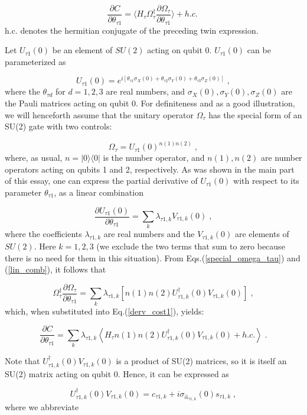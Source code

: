 \documentclass[12pt]{article}
\newcommand{\bra}[1]{\langle#1|}
\newcommand{\ket}[1]{|#1\rangle}
\newcommand{\beq}{\begin{equation}}
\newcommand{\eeq}{\end{equation}}
\begin{document}
{\beq
\frac{\partial C}{\partial\theta_{\tau 1}}
=
\langle H_\tau
\Omega_\tau^\dagger
\frac{\partial \Omega_\tau}{\partial\theta_{\tau 1}}
\rangle
+ h.c.
\;
\label{derv_cost1}
\eeq
h.c. denotes the hermitian conjugate
of the preceding twin expression.

Let $U_{\tau 1}(0)$
be an element of $SU(2)$ acting on qubit 0.
$U_{\tau 1}(0)$ can be parameterized as


\beq
U_{\tau 1}(0)=
e^{i[\theta_{\tau 1}\sigma_X(0)
+
\theta_{\tau 2}\sigma_Y(0)
+
\theta_{\tau 3}\sigma_Z(0)]}
\;,
\eeq
where the $\theta_{\tau d}$ for $d=1,2,3$
are real numbers,
and $\sigma_X(0), \sigma_Y(0), \sigma_Z(0)$
are
the Pauli matrices acting on qubit 0.
For definiteness and as a good illustration,
we will henceforth assume that the
unitary operator $\Omega_\tau$
has the special form
of an SU(2) gate with two controls:

\beq
\Omega_{\tau}=
U_{\tau 1}(0)^{n(1)n(2)}
\;,
\label{special_omega_tau}
\eeq
where, as usual, $n=\ket{0}\bra{0}$
is the number operator, and $n(1), n(2)$
are number operators acting on qubits 1 and 2,
respectively.
As was shown in the main part of this essay,
one can express the partial derivative of
$U_{\tau 1}(0)$ with respect
 to its parameter $\theta_{\tau 1}$,
as a linear combination


\beq
\frac{\partial U_{\tau 1}(0)}{\partial\theta_{\tau 1}}
=
\sum_k \lambda_{\tau 1,k} V_{\tau 1,k}(0)
\;,
\label{lin_comb}
\eeq
where the
coefficients $\lambda_{\tau 1,k}$
are real numbers and the
$V_{\tau 1,k}(0)$ are elements of $SU(2)$.
Here
$k=1,2,3$ (we exclude the two terms that sum to zero
because there is no need for them in this situation).
From Eqs.(\ref{special_omega_tau})
and (\ref{lin_comb}), it follows that

\beq
\Omega^\dagger_\tau
\frac{\partial \Omega_\tau}{\partial\theta_{\tau 1}}
=
\sum_k \lambda_{\tau 1,k}\left[
n(1)n(2)U^\dagger_{\tau 1,k}(0)V_{\tau 1,k}(0)
\right]
\;,
\eeq
which, when substituted into Eq.(\ref{derv_cost1}),
yields:

\beq
\frac{\partial C}{\partial\theta_{\tau 1}}
=
\sum_k \lambda_{\tau 1,k}
\left\langle
H_\tau n(1)n(2)U^\dagger_{\tau 1,k}(0)V_{\tau 1,k}(0)
+h.c.\right\rangle
\;.
\eeq

Note that
$U^\dagger_{\tau 1,k}(0)V_{\tau 1,k}(0)$ is
a product of SU(2) matrices, so
it is itself an SU(2)
matrix acting on qubit 0.
Hence, it can be expressed as

\beq
U^\dagger_{\tau 1,k}(0)V_{\tau 1,k}(0)
= c_{\tau 1,k} +i \sigma_{\hat{\alpha}_{\tau 1,k}}(0)
s_{\tau 1,k}
\;,
\eeq
where we abbreviate

}
\end{document}
